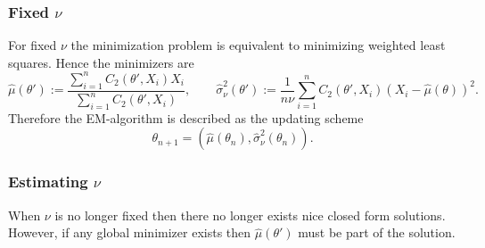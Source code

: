 \documentclass[a4paper,12pt]{article}
\begin{document}
\subsubsection*{Fixed $\nu$}
For fixed $\nu$ the minimization problem is equivalent to minimizing weighted least squares. Hence the minimizers are
\begin{equation}
    \hat\mu (\theta') :=\frac{\sum_{i=1}^{n}C_{2}(\theta', X_{i})X_{i}}{\sum_{i=1}^{n}C_{2}(\theta', X_{i})}, \quad\quad 
    \hat\sigma_{\nu}^2(\theta'):=\frac{1}{n\nu}\sum_{i=1}^{n}C_{2}(\theta', X_{i})(X_{i} - \hat\mu(\theta))^2.
\end{equation}
Therefore the EM-algorithm is described as the updating scheme
\begin{equation}
    \theta_{n + 1} = (\hat\mu(\theta_{n}), \hat\sigma_{\nu}^2(\theta_{n})).
\end{equation}
\subsubsection*{Estimating $\nu$}
When $\nu$ is no longer fixed then there no longer exists nice closed form solutions. However, if any global minimizer exists then $\hat\mu(\theta')$ must be part of the solution.
\end{document}
